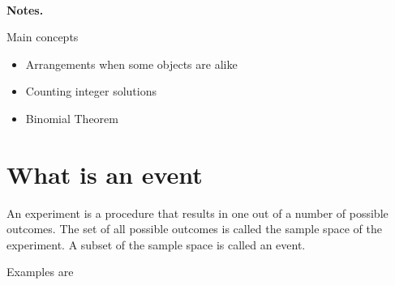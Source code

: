 \documentclass[12pt]{article}
\begin{document}
\begin{center}
\\
\vspace{1cm}
\end{center}


\medskip\noindent

{\bf Notes.}

Main concepts

\begin{itemize}
\item Arrangements when some objects are alike
\item Counting integer solutions
\item Binomial Theorem
\end{itemize}
\vspace{0.5cm}\noindent

\section*{What is an event}

An experiment is a procedure that results in one out of a number of possible outcomes. The set of all possible outcomes is called the sample space of the experiment. A subset of the sample space is called an event.

Examples are 
\end{document}
